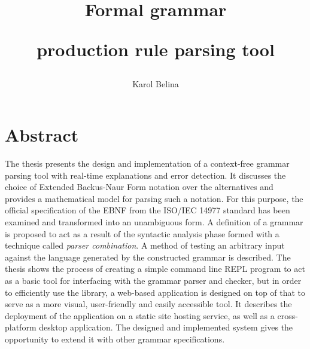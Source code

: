 \documentclass[english,engineering]{wizthesis}
\author{Karol Belina}
\title{Formal grammar\par production rule parsing tool}
\begin{document}
\frontmatter %

\maketitle

\chapter*{Abstract}

The thesis presents the design and implementation of a context-free grammar
parsing tool with real-time explanations and error detection. It discusses the
choice of Extended Backus-Naur Form notation over the alternatives and provides
a mathematical model for parsing such a notation. For this purpose, the official
specification of the EBNF from the ISO/IEC 14977 standard has been examined and
transformed into an unambiguous form. A definition of a grammar is proposed to
act as a result of the syntactic analysis phase formed with a technique called
\textit{parser combination}. A method of testing an arbitrary input against the
language generated by the constructed grammar is described. The thesis shows the
process of creating a simple command line REPL program to act as a basic tool
for interfacing with the grammar parser and checker, but in order to efficiently
use the library, a web-based application is designed on top of that to serve as
a more visual, user-friendly and easily accessible tool. It describes the
deployment of the application on a static site hosting service, as well as a
cross-platform desktop application. The designed and implemented system gives
the opportunity to extend it with other grammar specifications.
\end{document}
